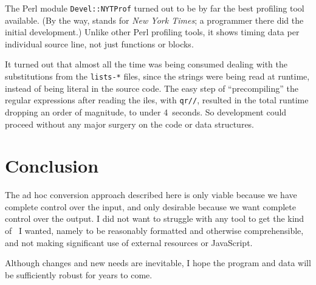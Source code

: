 \documentclass[final]{ltugboat}
\def\code#1{{\tt #1}}
\begin{document}
The Perl module \code{Devel::NYTProf} turned out to be by far the best
profiling tool available. (By the way,  stands for \textit{New
York Times}; a programmer there did the initial development.) Unlike
other Perl profiling tools, it shows timing data per individual source
line, not just functions or blocks.

It turned out that almost all the time was being consumed dealing with
the substitutions from the \code{lists-*} files, since the strings were
being read at runtime, instead of being literal in the source code. The
easy step of ``precompiling'' the regular expressions after reading the
iles, with \code{qr//}, resulted in the total runtime dropping an order
of magnitude, to under 4~seconds. So development could proceed without
any major surgery on the code or data structures.

\section{Conclusion}

The ad hoc conversion approach described here is only viable because we
have complete control over the input, and only desirable because we want
complete control over the output. I did not want to struggle with any
tool to get the kind of \HTML\ I wanted, namely to be reasonably
formatted and otherwise comprehensible, and not making significant use
of external resources or JavaScript.

Although changes and new needs are inevitable, I hope the program and
data will be sufficiently robust for years to come.




\makesignature
\end{document}
